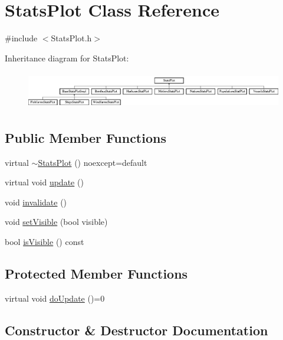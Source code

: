 \hypertarget{class_stats_plot}{}\section{Stats\+Plot Class Reference}
\label{class_stats_plot}


{\ttfamily \#include $<$Stats\+Plot.\+h$>$}

Inheritance diagram for Stats\+Plot\+:\begin{figure}[H]
\begin{center}
\leavevmode
\includegraphics[height=1.653543cm]{d0/d5d/class_stats_plot}
\end{center}
\end{figure}
\subsection*{Public Member Functions}
\begin{DoxyCompactItemize}
\item 
virtual \mbox{\hyperlink{class_stats_plot_ad2122fcab79ed1dc51bbdbc1f589853a}{$\sim$\+Stats\+Plot}} () noexcept=default
\item 
virtual void \mbox{\hyperlink{class_stats_plot_a289e6689c9d7104f730b8d5abfc44646}{update}} ()
\item 
void \mbox{\hyperlink{class_stats_plot_a30f70ce7b333628315ab0e226869cfbe}{invalidate}} ()
\item 
void \mbox{\hyperlink{class_stats_plot_afee63728cb75a6aeedb693cb7a00f4c5}{set\+Visible}} (bool visible)
\item 
bool \mbox{\hyperlink{class_stats_plot_a22e1c6707185a82bf8002bca835ded00}{is\+Visible}} () const
\end{DoxyCompactItemize}
\subsection*{Protected Member Functions}
\begin{DoxyCompactItemize}
\item 
virtual void \mbox{\hyperlink{class_stats_plot_a363a428cc00b389a55a03e6d5d7c526e}{do\+Update}} ()=0
\end{DoxyCompactItemize}


\subsection{Constructor \& Destructor Documentation}
\mbox{\label{class_stats_plot_ad2122fcab79ed1dc51bbdbc1f589853a}} 

